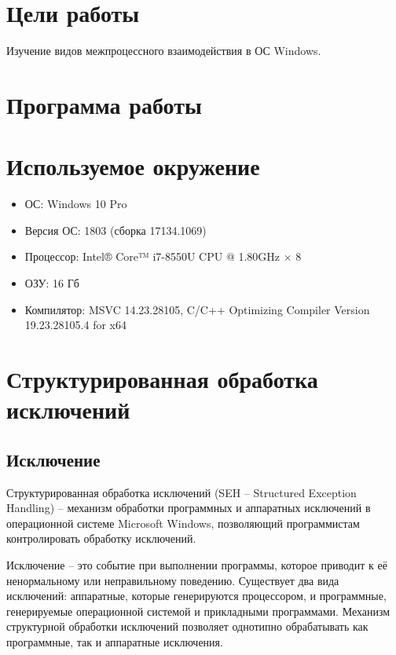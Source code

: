 





\tableofcontents
\newpage

\section{Цели работы}

Изучение видов межпроцессного взаимодействия в ОС Windows.

\section{Программа работы}



\section{Используемое окружение}

\begin{itemize}
	\item ОС: Windows 10 Pro
	\item Версия ОС: 1803 (сборка 17134.1069)
	\item Процессор: Intel® Core™ i7-8550U CPU @ 1.80GHz × 8
	\item ОЗУ: 16 Гб
	\item Компилятор: MSVC 14.23.28105, C/C++ Optimizing Compiler Version 19.23.28105.4 for x64
\end{itemize}

\section{Структурированная обработка исключений}

\subsection{Исключение}

Структурированная обработка исключений (SEH -- Structured Exception Handling) -- механизм обработки программных и аппаратных исключений в операционной системе Microsoft Windows, позволяющий программистам контролировать обработку исключений.

Исключение -- это событие при выполнении программы, которое приводит к её ненормальному или неправильному поведению. Существует два вида исключений: аппаратные, которые генерируются процессором, и программные, генерируемые операционной системой и прикладными программами. Механизм структурной обработки исключений позволяет однотипно обрабатывать как программные, так и аппаратные исключения.

